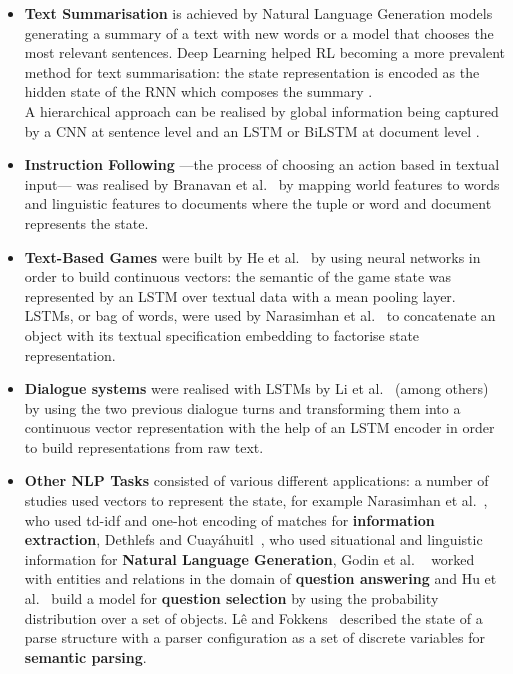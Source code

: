 \documentclass[11pt]{article}
\begin{document}
\begin{itemize}


\item \textbf{Text Summarisation} is achieved by Natural Language Generation models generating a summary of a text with new words or a model that chooses the most relevant sentences. Deep Learning helped RL becoming a more prevalent method for text summarisation: the state representation is encoded as the hidden state of the RNN which composes the summary \cite{ling-etal-2017-learning}. \\ A hierarchical approach can be realised by global information being captured by a CNN at sentence level and an LSTM or BiLSTM at document level \cite{chen-bansal-2018-fast}.
\item \textbf{Instruction Following} ---the process of choosing an action based in textual input--- was realised by Branavan et al.~ by mapping world features to words and linguistic features to documents where the tuple or word and document represents the state.
\item \textbf{Text-Based Games} were built by He et al.~ by using neural networks in order to build continuous vectors: the semantic of the game state was represented by an LSTM over textual data with a mean pooling layer.\\ LSTMs, or bag of words, were used by Narasimhan et al.~ to concatenate an object with its textual specification embedding to factorise state representation.
\item \textbf{Dialogue systems} were realised with LSTMs by Li et al.~ (among others) by using the two previous dialogue turns and transforming them into a continuous vector representation with the help of an LSTM encoder in order to build representations from raw text. 
\item \textbf{Other NLP Tasks} consisted of various different applications: a number of studies used vectors to represent the state, for example Narasimhan et al.~, who used td-idf and one-hot encoding of matches for \textbf{information extraction}, Dethlefs and Cuayáhuitl~, who used situational and linguistic information for \textbf{Natural Language Generation}, Godin et al.
~ worked with entities and relations in the domain of \textbf{question answering} and Hu et al.~ build a model for \textbf{question selection} by using the probability distribution over a set of objects. Lê and Fokkens~ described the state of a parse structure with a parser configuration as a set of discrete variables for \textbf{semantic parsing}.

\end{itemize}
\end{document}
